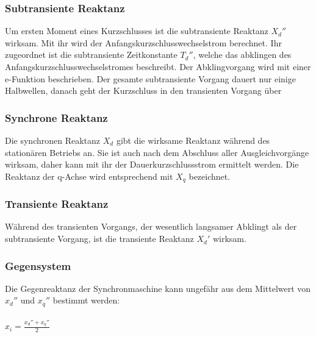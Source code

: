 \documentclass{scrartcl}
\begin{document}
\begin{onehalfspace}


\subsubsection{Subtransiente Reaktanz}
Um ersten Moment eines Kurzschlusses ist die subtransiente Reaktanz $X_d''$ wirksam. Mit ihr wird der Anfangskurzschlusswechselstrom berechnet. Ihr zugeordnet ist die subtransiente Zeitkonstante $T_d''$, welche das abklingen des Anfangskurzschlusswechselstromes beschreibt. Der Abklingvorgang wird mit einer e-Funktion beschrieben. Der gesamte subtransiente Vorgang dauert nur einige Halbwellen, danach geht der Kurzschluss in den transienten Vorgang über

\subsubsection{Synchrone Reaktanz}
Die synchronen Reaktanz $X_d$ gibt die wirksame Reaktanz während des stationären Betriebs an. Sie ist auch nach dem Abschluss aller Ausgleichvorgänge wirksam, daher kann mit ihr der Dauerkurzschlussstrom ermittelt werden. Die Reaktanz der q-Achse wird entsprechend mit $X_q$ bezeichnet.

\subsubsection{Transiente Reaktanz}
Während des transienten Vorgangs, der wesentlich langsamer Abklingt als der subtransiente Vorgang, ist die transiente Reaktanz $X_d'$ wirksam.

\subsubsection{Gegensystem}
Die Gegenreaktanz der Synchronmaschine kann ungefähr aus dem Mittelwert von $x_d''$ und $x_q''$ bestimmt werden: \\ \\
$x_i = \frac{x_d'' + x_q''}{2}$


\end{onehalfspace}
\end{document}
